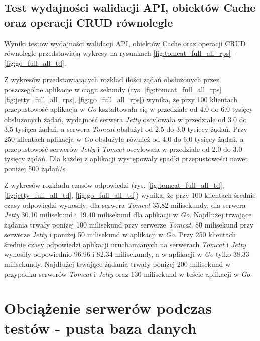 % 
\clearpage

\subsection{Test wydajności walidacji API, obiektów Cache oraz operacji CRUD równolegle}

Wyniki testów wydajności walidacji API, obiektów Cache oraz operacji CRUD równolegle przedstawiają wykresy na rysunkach \ref{fig:tomcat_full_all_rps} - \ref{fig:go_full_all_td}.              

Z wykresów przedstawiających rozkład ilości żądań obsłużonych przez poszczególne aplikacje w ciągu sekundy  (rys. \ref{fig:tomcat_full_all_rps} \ref{fig:jetty_full_all_rps}, \ref{fig:go_full_all_rps}) wynika, że przy 100 klientach przepustowość aplikacja w \textsl{Go} kształtowała się w przedziale od 4.0 do 6.0 tysięcy obsłużonych żądań, wydajność serwera \textsl{Jetty} oscylowała w przedziale od 3.0 do 3.5 tysiąca  żądań, a  serwera \textsl{Tomcat}  obsłużył od 2.5 do 3.0 tysięcy żądań. Przy 250 klientach aplikacja w \textsl{Go} obsłużyła również od 4.0 do 6.0 tysięcy żądań, a przepustowość serwerów \textsl{Jetty} i \textsl{Tomcat} oscylowała w przedziale od 2.0 do 3.0 tysięcy żądań. Dla każdej z aplikacji występowały spadki przepustowości nawet poniżej 500 żądań/s

Z wykresów rozkładu czasów odpowiedzi (rys. \ref{fig:tomcat_full_all_td}, \ref{fig:jetty_full_all_td}, \ref{fig:go_full_all_td}) wynika, że przy 100 klientach średnie czasy odpowiedzi wynosiły: dla serwera \textsl{Tomcat} 35.82 milisekundy, dla serwera \textsl{Jetty} 30.10 milisekund i 19.40 milisekund dla aplikacji w \textsl{Go}. Najdłużej trwające żądania trwały poniżej 100 milisekund przy serwerze \textsl{Tomcat}, 80 milisekund przy serwerze \textsl{Jetty} i  poniżej 50 milisekund  w aplikacji w \textsl{Go}. Przy 250 klientach średnie czasy odpowiedzi aplikacji uruchamianych na serwerach \textsl{Tomcat}  i \textsl{Jetty}   wynosiły odpowiednio 96.96 i 82.34 milisekundy, a w aplikacji w \textsl{Go} tylko 38.33 milisekundy. Najdłużej trwające żądania trwały poniżej 200 milisekund w przypadku serwerów \textsl{Tomcat} i \textsl{Jetty} oraz 130 milisekund w teście aplikacji w \textsl{Go}.

% 
\clearpage

\section{Obciążenie serwerów podczas testów - pusta baza danych}

